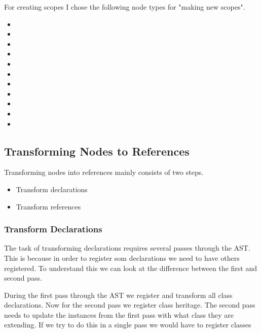 For creating scopes I chose the following node types for "making new scopes".

\begin{multicols}{2}
\begin{itemize}
    \item {}
    \item {}
    \item {}
    \item {}
    \item {}
    \item {}
    \item {}
    \item {}
    \item {}
    \item {}
    \item {}
\end{itemize}
\end{multicols}

\subsection{Transforming Nodes to References}\label{subsec:transforming-nodes-to-references}

Transforming nodes into references mainly consists of two steps.

\begin{itemize}
    \item Transform declarations
    \item Transform references
\end{itemize}

\subsubsection{Transform Declarations}

The task of transforming declarations requires several passes through the AST\@.
This is because in order to register som declarations we need to have others registered.
To understand this we can look at the difference between the first and second pass.

During the first pass through the AST we register and transform all class declarations.
Now for the second pass we register class heritage.
The second pass needs to update the  instances from the first pass with what class they are extending.
If we try to do this in a single pass we would have to register classes

